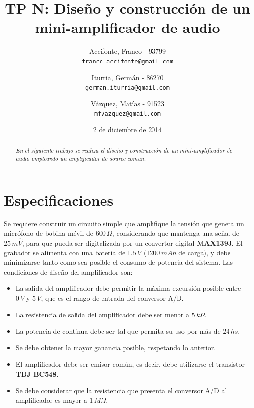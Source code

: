\documentclass[10pt,spanish,a4paper,openany,notitlepage]{article}
\begin{document}
\title{\textbf{TP N: Diseño y construcción de un mini-amplificador de audio}}
\author{
  Accifonte, Franco - 93799\\
  \texttt{franco.accifonte@gmail.com}  
  \and
  Iturria, Germán  - 86270 \\
  \texttt{german.iturria@gmail.com}
  \and
   Vázquez, Matías - 91523\\
  \texttt{mfvazquez@gmail.com}
}
\date{2 de diciembre de 2014}
\maketitle

\begin{abstract} %
\emph{En el siguiente trabajo se realiza el diseño y construcción de un
mini-amplificador de audio empleando un amplificador de source común.}
\end{abstract}

\section{Especificaciones}

Se requiere construir un circuito simple que amplifique la tensión que
genera un micrófono de bobina móvil de $600\, \unit{\Omega}$, considerando
que mantenga una señal de $25\, \unit{m\widehat{V}}$, para que pueda ser digitalizada
por un convertor digital {\bf MAX1393}. El grabador se alimenta con
una batería de $1.5\,\unit{V}$ ($1200\, \unit{mAh}$ de carga), y debe
minimizarse tanto como sea posible el consumo de potencia del sistema.
Las condiciones de diseño del amplificador son:

\begin{itemize}
\item La salida del amplificador debe permitir la máxima excursión
posible entre $0\, \unit{V}$ y $5\, \unit{V}$, que es el rango de entrada
del conversor A/D.
\item La resistencia de salida del amplificador debe ser menor a $5\, \unit{k\Omega}$.
\item La potencia de contínua debe ser tal que permita su uso por más de
$24\, \unit{hs}$.
\item Se debe obtener la mayor ganancia posible, respetando lo anterior.
\item El amplificador debe ser emisor común, es decir, debe utilizarse
el transistor {\bf TBJ BC548}.
\item Se debe considerar que la resistencia que presenta el conversor A/D
al amplificador es mayor a $1\, \unit{M\Omega}$.
\end{itemize} 
\end{document}
